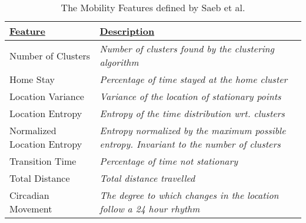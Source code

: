 \begin{table}[h]
    \centering
\begin{tabular}{|p{}|p{}|}
\hline
{\ul \textbf{Feature}}      & {\ul \textbf{Description}}                                                                                                                     \\ \hline
Number of Clusters          & \textit{Number of clusters found by the clustering algorithm}                                       \\ \hline
Home Stay                   & \textit{Percentage of time stayed at the home cluster}                                              \\ \hline
Location Variance           & \textit{Variance of the location of stationary points}                                              \\ \hline
Location Entropy            & \textit{Entropy of the time distribution wrt. clusters}                                             \\ \hline
Normalized Location Entropy & \textit{Entropy normalized by the maximum possible entropy. Invariant to the number of clusters} \\ \hline
Transition Time             & \textit{Percentage of time not stationary}                                                                                                  \\ \hline
Total Distance              & \textit{Total distance travelled}                                                                                                              \\ \hline
Circadian Movement          & \textit{The degree to which changes in the location follow a 24 hour rhythm}                        \\ \hline
\end{tabular}
    \caption{The Mobility Features defined by Saeb et al. \cite{Saeb2015}}
    \label{tab:saeb-features}
\end{table}




